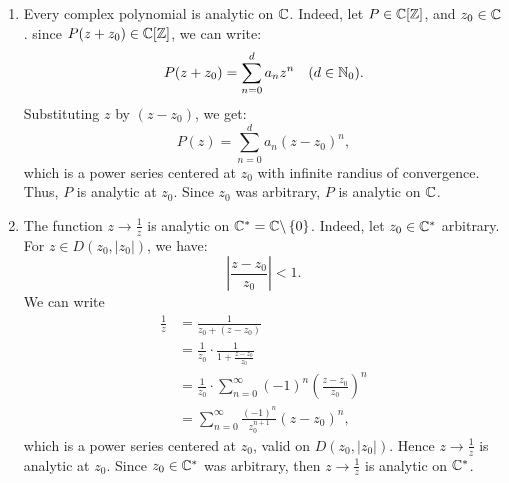 \begin{example}
  \begin{enumerate}
    \item Every complex polynomial is analytic on $\mathbb{C}  $. Indeed, let $P \in  \mathbb{C} [ \mathbb{Z} ]$, and 
      $z_0 \in   \mathbb{C}  $. since $P(z + z_0)  \in  \mathbb{C} [ \mathbb{Z}]$, we can write: 
      \[
      P(z+z_0)  = 
      \sum_{n=0}^{d} a_n z^n  \quad (d \in   \mathbb{N}_0) .
      \]
      Substituting $z $ by $(z-z_0)  $, we get: 
      \[
      P(z) = 
      \sum_{n=0}^{d} a_n (z-z_0) ^n    ,
      \]
      which is a power series centered at $z_0 $ with infinite randius of convergence. 
      Thus, $P $ is analytic at $z_0 $. Since $z_0 $ was arbitrary, $P $ is analytic
      on $\mathbb{C}$. 
      \divider
      \item 
        The function $z \longrightarrow  \frac{1}{z}$ is analytic on 
        $\mathbb{C} ^{*} = \mathbb{C}  \backslash  \left\{ 0 \right\} $. Indeed, let $z_0 \in   \mathbb{C} ^{*} $ arbitrary. \\
        For $z \in  D(z_0, \left| z_0 \right|  )  $, we have: 
        \[
        \left| \frac{z-z_0}{z_0} \right|  < 1.
        \]
        We can write 
        \begin{align*}
          \frac{1}{z} &= \frac{1}{z_0 + (z-z_0) } 
          \\
          &= 
          \frac{1}{z_0} \cdot \frac{1}{1 + \frac{z-z_0}{z_0} } \\
          &= 
          \frac{1}{z_0} \cdot  
          \sum_{n=0}^{\infty} (-1) ^n  
          \left( \frac{z-z_0}{z_0} \right) ^n  \\ 
          &= 
          \sum_{n=0}^{\infty} \frac{(-1) ^n }{z_0^{n+1}} 
          (z-z_0) ^n ,
        \end{align*}
        which is a power series centered at $z_0 $, valid on $D(z_0, \left| z_0 \right|  )  $. Hence
         $z \longrightarrow \frac{1}{z} $ is analytic at $z_0 $. Since $z_0 \in   \mathbb{C} ^{*} $ was
         arbitrary, then $z \longrightarrow \frac{1}{z} $ is analytic on $\mathbb{C} ^{*} $.
  \end{enumerate}
\end{example}
